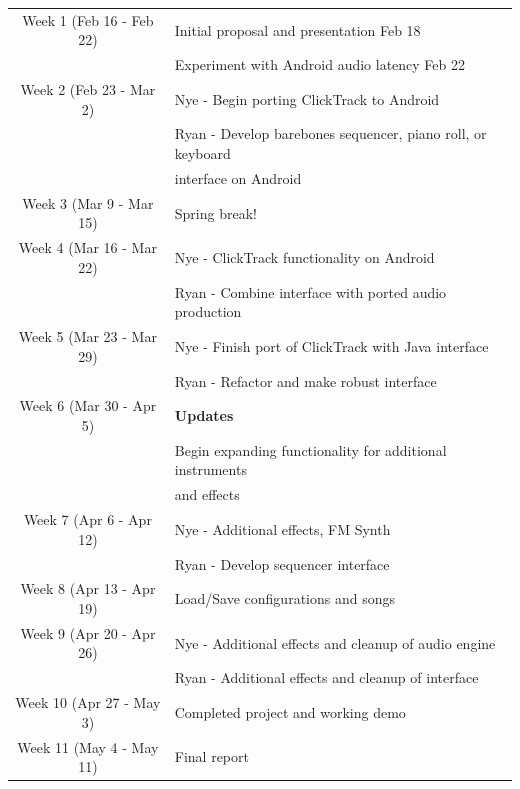 \documentclass[letterpaper,12pt]{article}
\begin{document}
\onehalfspacing
\begin{tabular}{ c | l }  

  Week 1 (Feb 16 - Feb 22) & Initial proposal and presentation Feb 18 \\ 
                           & Experiment with Android audio latency Feb 22 \\ \hline
  Week 2 (Feb 23 - Mar 2)  & Nye - Begin porting ClickTrack to Android \\
                           & Ryan -  Develop barebones sequencer, piano roll, or keyboard \\ &interface on Android \\ \hline
  Week 3 (Mar 9 - Mar 15)  & Spring break!  \\ \hline
  Week 4 (Mar 16 - Mar 22) & Nye - ClickTrack functionality on Android \\ 
                           & Ryan - Combine interface with ported audio production \\ \hline
  Week 5 (Mar 23 - Mar 29) & Nye - Finish port of ClickTrack with Java interface \\
                           & Ryan - Refactor and make robust interface \\ \hline
  Week 6 (Mar 30 - Apr 5)  & \textbf{Updates} \\
                           & Begin expanding functionality for additional instruments \\ & and effects\\ \hline
  Week 7 (Apr 6 - Apr 12)  &  Nye - Additional effects, FM Synth \\
                           & Ryan - Develop sequencer interface \\ \hline
  Week 8 (Apr 13 - Apr 19) & Load/Save configurations and songs \\                           \hline
  Week 9 (Apr 20 - Apr 26) & Nye - Additional effects and cleanup of audio engine \\
                           & Ryan - Additional effects and cleanup of interface \\ \hline
  Week 10 (Apr 27 - May 3) & Completed project and working demo  \\ \hline
  Week 11 (May 4 - May 11) & Final report  \\ 
\end{tabular}
  
\end{document}
